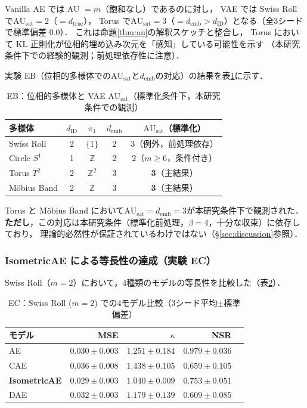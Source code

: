 \documentclass[11pt,a4paper]{jsarticle}
\newcommand{\dID}{d_{\mathrm{ID}}}
\newcommand{\dtrue}{d_{\mathrm{true}}}
\newcommand{\kap}{\kappa}
\newcommand{\AUsat}{\mathrm{AU}_{\mathrm{sat}}}
\newcommand{\demb}{d_{\mathrm{emb}}}
\begin{document}
Vanilla AE では AU $= m$（飽和なし）であるのに対し，
VAE では Swiss Roll で$\AUsat = 2$（$= \dtrue$），
Torus で$\AUsat = 3$（$= \demb > \dID$）となる（全3シードで標準偏差 0.0）．
これは命題\ref{thm:au}の解釈スケッチと整合し，
Torus において KL 正則化が位相的埋め込み次元を「感知」している可能性を示す
（本研究条件下での経験的観測；前処理依存性に注意）．

実験 EB（位相的多様体での$\AUsat$と$\demb$の対応）の結果を表\ref{tab:eb_summary}に示す．

\begin{table}[H]
\centering
\caption{EB：位相的多様体と VAE $\AUsat$（標準化条件下，本研究条件での観測）}
\label{tab:eb_summary}
\small
\begin{tabular}{lcccc}
\toprule
多様体 & $\dID$ & $\pi_1$ & $\demb$ & $\AUsat$（標準化） \\
\midrule
Swiss Roll   & 2 & $\{1\}$        & 2 & 3（例外，前処理依存）\\
Circle $S^1$ & 1 & $\mathbb{Z}$   & 2 & 2（$m \geq 6$，条件付き）\\
Torus $T^2$  & 2 & $\mathbb{Z}^2$ & 3 & \textbf{3}（主結果）\\
Möbius Band  & 2 & $\mathbb{Z}$   & 3 & \textbf{3}（主結果）\\
\bottomrule
\end{tabular}
\end{table}

Torus と Möbius Band において$\AUsat = \demb = 3$が本研究条件下で観測された．
\textbf{ただし}，この対応は本研究条件（標準化前処理，$\beta = 4$，十分な収束）に依存しており，
理論的必然性が保証されているわけではない（§\ref{sec:discussion}参照）．

\subsubsection{IsometricAE による等長性の達成（実験 EC）}

Swiss Roll（$m = 2$）において，4種類のモデルの等長性を比較した（表\ref{tab:ec}）．

\begin{table}[H]
\centering
\caption{EC：Swiss Roll ($m=2$) での4モデル比較（3シード平均$\pm$標準偏差）}
\label{tab:ec}
\small
\begin{tabular}{lrrrr}
\toprule
モデル & MSE & $\kap$ & NSR \\
\midrule
AE & $0.030\pm0.003$ & $1.251\pm0.184$ & $0.979\pm0.036$ \\
CAE & $0.036\pm0.008$ & $1.438\pm0.105$ & $0.659\pm0.105$ \\
\textbf{IsometricAE} & $\boldsymbol{0.029\pm0.003}$ & $\boldsymbol{1.040\pm0.009}$ & $0.753\pm0.051$ \\
DAE & $0.032\pm0.003$ & $1.179\pm0.139$ & $0.609\pm0.085$ \\
\bottomrule
\end{tabular}
\end{table}
\end{document}
